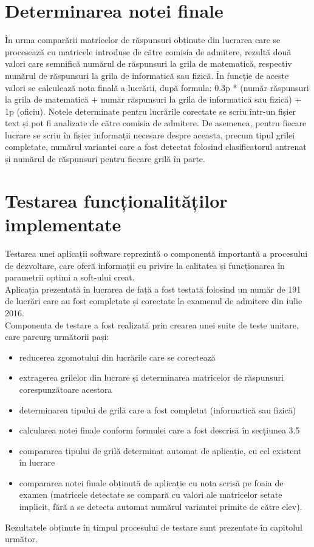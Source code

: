 \documentclass[a4paper,12pt]{report}
\newcommand\tab[1][1cm]{\hspace*{#1}}
\begin{document}
\section{Determinarea notei finale}
\tab În urma comparării matricelor de răspunsuri obținute din lucrarea care se procesează cu matricele introduse de către comisia de admitere, rezultă două valori care semnifică numărul de răspunsuri la grila de matematică, respectiv numărul de răspunsuri la grila de informatică sau fizică. În funcție de aceste valori se calculează nota finală a lucrării, după formula: 0.3p * (număr răspunsuri la grila de matematică + număr răspunsuri la grila de informatică sau fizică) + 1p (oficiu). Notele determinate pentru lucrările corectate se scriu într-un fișier text și pot fi analizate de către comisia de admitere. De asemenea, pentru fiecare lucrare se scriu în fișier informații necesare despre aceasta, precum tipul grilei completate, numărul variantei care a fost detectat folosind clasificatorul antrenat și numărul de răspunsuri pentru fiecare grilă în parte.
\section{Testarea funcționalităților implementate}
\tab Testarea unei aplicații software reprezintă o componentă importantă a procesului de dezvoltare, care oferă informații cu privire la calitatea și funcționarea în parametrii optimi a soft-ului creat. 
\\ \tab Aplicația prezentată în lucrarea de față a fost testată folosind un număr de 191 de lucrări  care au fost completate și corectate la examenul de admitere din iulie 2016.
\\ \tab Componenta de testare a fost realizată prin crearea unei suite de teste unitare, care parcurg următorii pași:
\begin{itemize}
\setlength\itemsep{1pt}
\item reducerea zgomotului din lucrările care se corectează
\item extragerea grilelor din lucrare și determinarea matricelor de răspunsuri corespunzătoare acestora
\item determinarea tipului de grilă care a fost completat (informatică sau fizică)
\item calcularea notei finale conform formulei care a fost descrisă în secțiunea 3.5
\item compararea tipului de grilă determinat automat de aplicație, cu cel existent în lucrare
\item compararea notei finale obținută de aplicație cu nota scrisă pe foaia de examen (matricele detectate se compară cu valori ale matricelor setate implicit, fără a se detecta automat numărul variantei primite de către elev).
\end{itemize}
\tab Rezultatele obținute în timpul procesului de testare sunt prezentate în capitolul următor. 
\end{document}
